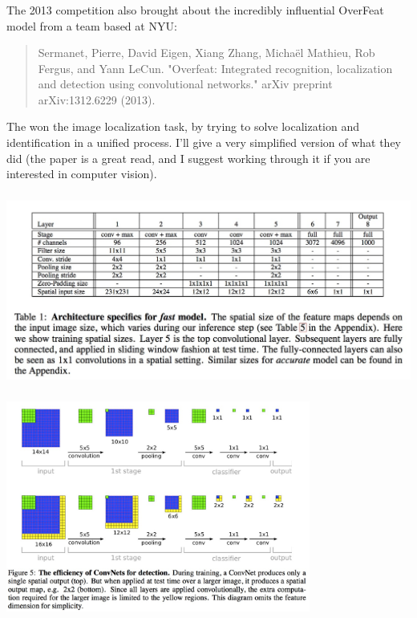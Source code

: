 \documentclass[xetex,mathserif,serif,aspectratio=169]{beamer}
\begin{document}
\begin{frame}[fragile] \frametitle{} \oldB \small


The 2013 competition also brought about the incredibly influential
OverFeat model from a team based at NYU:
\begin{quote}
Sermanet, Pierre, David Eigen, Xiang Zhang, Michaël Mathieu, Rob Fergus, and Yann LeCun. "Overfeat: Integrated recognition, localization and detection using convolutional networks." arXiv preprint arXiv:1312.6229 (2013).
\end{quote}
The won the image localization task, by trying to solve localization
and identification in a unified process. I'll give a very simplified
version of what they did (the paper is a great read, and I suggest
working through it if you are interested in computer vision).

\end{frame}

\begin{frame}[fragile] \frametitle{} \oldB \small

\begin{center}
\includegraphics[width=\textwidth]{img/overFeatModel.jpg}
\end{center}

\end{frame}

\begin{frame}[fragile] \frametitle{} \oldB \small

\begin{center}
\includegraphics[width=0.75\textwidth]{img/overFeatIdea.jpg}
\end{center}

\end{frame}
\end{document}
